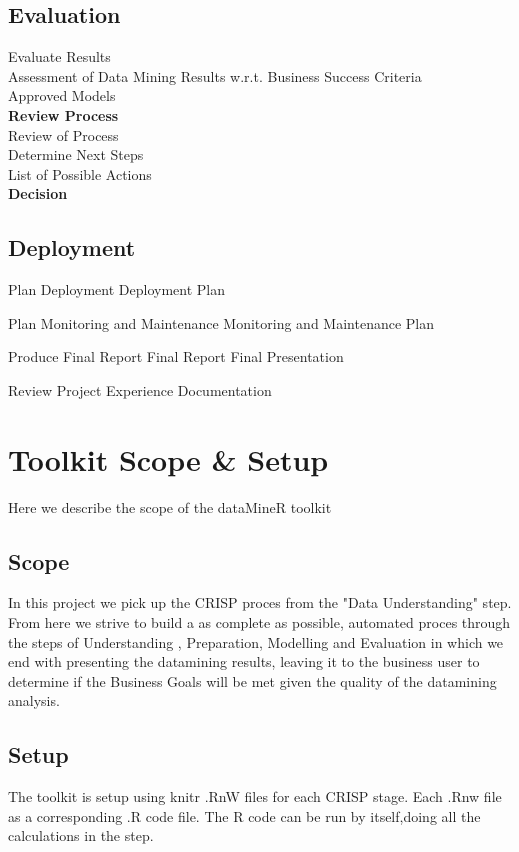 \documentclass[12pt,a4paper,titlepage]{report}\usepackage{graphicx, color}
\begin{document}
\subsection{Evaluation }
Evaluate Results \\
Assessment of Data Mining Results w.r.t. Business Success Criteria \\
Approved Models \\

\textbf{Review Process} \\ 
Review of Process \\

Determine Next Steps \\
List of Possible Actions \\

\textbf{Decision}

\subsection{Deployment}
Plan Deployment
Deployment Plan

Plan Monitoring and Maintenance
Monitoring and Maintenance Plan

Produce Final Report
Final Report
Final Presentation

Review Project Experience 
Documentation

\section{Toolkit Scope \& Setup}
Here we describe the scope of the dataMineR toolkit
\subsection{Scope}
In this project we pick up the CRISP proces from the "Data Understanding" step. From here we strive to build a as complete as possible, automated proces through the steps of Understanding , Preparation, Modelling and Evaluation in which we end with presenting the datamining results, leaving it to the business user to determine if the Business Goals will be met given the quality of the datamining analysis. 
\subsection{Setup}
The toolkit is setup using knitr .RnW files for each CRISP stage. Each .Rnw file as a corresponding .R code file. The R code can be run by itself,doing all the calculations in the step.
\end{document}
